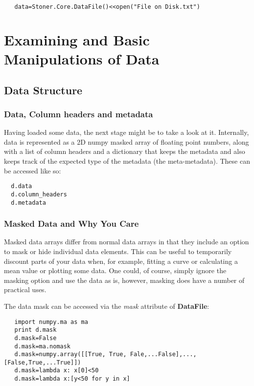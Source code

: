 \documentclass[a4paper,11pt]{scrartcl}
\begin{document}
\begin{lstlisting}
   data=Stoner.Core.DataFile()<<open("File on Disk.txt")
\end{lstlisting}

\section{Examining and Basic Manipulations of Data}
\subsection{Data Structure}
\subsubsection{Data, Column headers and metadata}
Having loaded some data, the next stage might be to take a look at it.
Internally, data is represented as a 2D numpy masked array of floating point numbers,
along with a list of column headers and a dictionary that keeps the metadata and
also keeps track of the expected type of the metadata (\ie the meta-metadata).
These can be accessed like so:
\begin{lstlisting}
  d.data
  d.column_headers
  d.metadata
\end{lstlisting}

\subsubsection{Masked Data and Why You Care}\label{(maskeddata)}
Masked data arrays differ from normal data arrays in that they include an option to mask or hide individual data elements. This can be useful to temporarily discount parts of your data when, for example, fitting a curve or calculating a mean value or plotting some data. One could, of course, simply ignore the masking option and use the data as is, however, masking does have a number of practical uses.

The data mask can be accessed via the \textit{mask} attribute of \textbf{DataFile}:
\begin{lstlisting}
   import numpy.ma as ma
   print d.mask
   d.mask=False
   d.mask=ma.nomask
   d.mask=numpy.array([[True, True, Fale,...False],...,[False,True,...True]])
   d.mask=lambda x: x[0]<50
   d.mask=lambda x:[y<50 for y in x]
\end{lstlisting}
\end{document}
